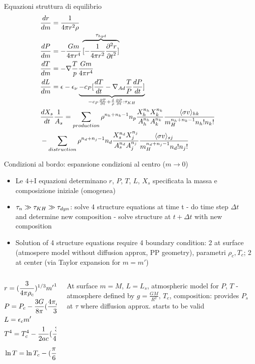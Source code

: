 \begin{frame}{Equazioni struttura di equilibrio}
\begin{align*}
&\TDy{m}{r}=\frac{1}{4\pi r^2\rho}\\
&\TDy{m}{P}=-\frac{Gm}{4\pi r^4}\overbrace{[-\frac{1}{4\pi r^2}\PtwoDy{t}{r}]}^{\tau_{hyd}}\\
&\TDy{m}{T}=-\nabla\frac{T}{p}\frac{Gm}{4\pi r^4}\\
&\TDy{m}{L}=\epsilon-\epsilon_{\nu} \underbrace{-c_P[\TDy{t}{T}-\nad\frac{T}{P}\TDy{t}{P}]}_{-c_P\PDy{t}{T}+\frac{\delta}{\rho}\PDy{t}{P}: \tkh}\\
&\TDy{t}{X_s}\frac{1}{A_s}=\sum_{production}\rho^{n_h+n_k-1}n_p\frac{X_h^{n_h}X_k^{n_k}}{A_h^{n_h}A_k^{n_k}}\frac{\exv{\sigma v}_{hk}}{m_H^{n_h+n_k-1}n_h!n_k!}\\
&-\sum_{distruction}\rho^{n_d+n_j-1}n_d\frac{X_s^{n_d}X_j^{n_j}}{A_s^{n_d}A_j^{n_j}}\frac{\exv{\sigma v}_{sj}}{m_H^{n_d+n_j-1}n_d!n_j!}
\end{align*}
\end{frame}

\begin{frame}{Condizioni al bordo: espansione condizioni al centro ($m\to0$)}
\begin{itemize}
\item Le 4+I equazioni determinano $r$, $P$, $T$, $L$, $X_s$ specificata la massa e composizione iniziale (omogenea)
\item $\tau_n\gg\tkh\gg\tau_{dyn}$: solve 4 structure equations at time t - do time step $\Delta t$ and determine new composition - solve structure at $t+\Delta t$ with new composition
\item Solution of 4 structure equations require 4 boundary condition: 2 at surface (atmospere model without diffusion approx, PP geometry), parametri $\rho_c,T_c$; 2 at center (via Taylor expansion for $m=m'$)
\end{itemize}
\begin{columns}[T]
\begin{column}{0.65\textwidth}
\begin{align*}
&r=(\frac{3}{4\pi\rho_c})\expy{1/3}{m'}\expy{1/3}\\
&P=P_c-\frac{3G}{8\pi}(\frac{4\pi\rho_c}{3})\expy{4/3}{m'}\expy{2/3}\\
&L=\epsilon_cm'\\
&T^4=T_c^4-\frac{1}{2ac}(\frac{3}{4\pi})\expy{2/3}\kappa_c\epsilon_c\rho_c\expy{4/3}{m'}\expy{2/3}\tag*{rad}\\
&\ln{T}=\ln{T_c}-(\frac{\pi}{6})\expy{1/3}G\frac{{\nad}_c\rho_c\expy{4/3}}{P_c}{m'}\expy{2/3}\tag*{con}
\end{align*}
\end{column}
\begin{column}{0.35\textwidth}
At surface $m=M$, $L=L_s$, atmospheric model for $P$, $T$ - atmosphere defined by $g=\frac{GM}{R^2}$, $T_e$, composition: provides $P_s$ at $\tau$ where diffusion approx. starts to be valid
\end{column}
\end{columns}
\end{frame}

